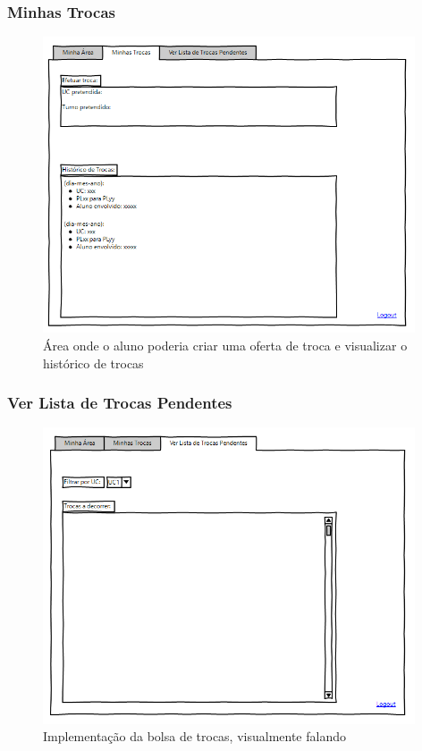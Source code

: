 \documentclass[a4paper]{article}
\begin{document}
\subsubsection{Minhas Trocas}
\begin{figure}[H]
\centering
\includegraphics[width=11cm]{interface_3}
\caption{Área onde o aluno poderia criar uma oferta de troca e visualizar o histórico de trocas}
\label{}
\end{figure}

\subsubsection{Ver Lista de Trocas Pendentes}
\begin{figure}[H]
\centering
\includegraphics[width=11cm]{interface_4}
\caption{Implementação da bolsa de trocas, visualmente falando}
\label{}
\end{figure}
\end{document}
